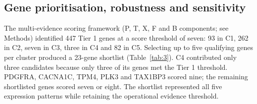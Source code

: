 \documentclass[11pt,a4paper]{article}
\begin{document}
\subsection*{Gene prioritisation, robustness and sensitivity}
The multi-evidence scoring framework (P, T, X, F and B components; see Methods) identified 447 Tier 1 genes at a score threshold of seven: 93 in C1, 262 in C2, seven in C3, three in C4 and 82 in C5. Selecting up to five qualifying genes per cluster produced a 23-gene shortlist (Table~\ref{tab:3}). C4 contributed only three candidates because only three of its genes met the Tier 1 threshold. PDGFRA, CACNA1C, TPM4, PLK3 and TAX1BP3 scored nine; the remaining shortlisted genes scored seven or eight. The shortlist represented all five expression patterns while retaining the operational evidence threshold.
\end{document}
